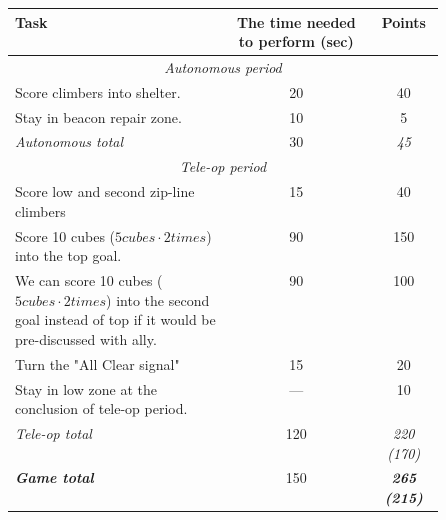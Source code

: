  \newline

\begin{table}[H]
	\begin{center}
		\begin{tabular}{|p{0.5\linewidth}|c|c|}
			\hline
			Task & The time needed to perform (sec) & Points \\
			\hline
			
			\multicolumn{3}{|c|}{\textit{Autonomous period}} \\
			\hline
			Score climbers into shelter. & 20 & 40 \\
			\hline
			Stay in beacon repair zone. & 10 & 5 \\
			\hline
			\textit{Autonomous total} & 30 & \textit{45} \\
			\hline
			
			\multicolumn{3}{|c|}{\textit{Tele-op period}}  \\
			\hline
			Score low and second zip-line climbers & 15 & 40\\
			\hline
			Score 10 cubes ($5 cubes \cdot 2 times$) into the top goal. & 90 & 150\\
			\hline
			We can score 10 cubes ($5 cubes \cdot 2 times$) into the second goal instead of top if it would be pre-discussed with ally. & 90 & 100\\
			\hline
			Turn the "All Clear signal" & 15 & 20\\
			\hline
			Stay in low zone at the conclusion of tele-op period. & --- & 10\\
			\hline
			\textit{Tele-op total} & 120 & \textit{220 (170)} \\
			\hline
			\textbf{\textit{Game total}} & 150 & \textbf{\textit{265 (215)}} \\
			\hline
		\end{tabular}
	\end{center}
\end{table}

